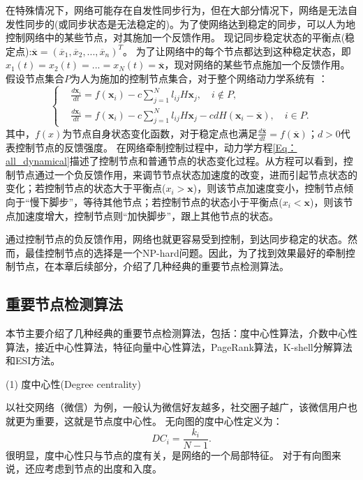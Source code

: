 在特殊情况下，网络可能存在自发性同步行为，但在大部分情况下，网络是无法自发性同步的(或同步状态是无法稳定的)。为了使网络达到稳定的同步，可以人为地控制网络中的某些节点，对其施加一个反馈作用。
现记同步稳定状态的平衡点(稳定点):$\overline{\textbf{x}} = (\overline{x}_1, \overline{x}_2, ..., \overline{x}_n)^T$。
为了让网络中的每个节点都达到这种稳定状态，即$x_1(t) = x_2(t) = ... = x_N(t) = \overline{\textbf{x}} $，现对网络的某些节点施加一个反馈作用。假设节点集合$ P $为人为施加的控制节点集合，对于整个网络动力学系统有 \cite{Zhou2019}：
\begin{equation}
\left\{
\begin{aligned}
&\frac{d\textbf{x}_i}{dt} = f(\textbf{x}_i)-c\sum_{j = 1}^{N}l_{ij}H\textbf{x}_j,\quad  i \notin P, \\
&\frac{d\textbf{x}_{i}}{dt} = f(\textbf{x}_{i})-c\sum_{j = 1}^{N}l_{ij}H \textbf{x}_j-cdH(\textbf{x}_{i}-\overline{\textbf{x}}), \quad i\in P.
\end{aligned}
\right.
\label{Eq：all_dynamical}
\end{equation}
其中，$ f(x) $为节点自身状态变化函数，对于稳定点也满足$\frac{d\overline{\textbf{x}}}{dt}=f(\overline{\textbf{x}})$；$ d>0 $代表控制节点的反馈强度。
在网络牵制控制过程中，动力学方程\ref{Eq：all_dynamical}描述了控制节点和普通节点的状态变化过程。从方程可以看到，控制节点通过一个负反馈作用，来调节节点状态加速度的改变，进而引起节点状态的变化；若控制节点的状态大于平衡点($ x_i>\textbf{x}$)，则该节点加速度变小，控制节点倾向于“慢下脚步”，等待其他节点；若控制节点的状态小于平衡点($ x_i<\textbf{x} $)，则该节点加速度增大，控制节点则“加快脚步”，跟上其他节点的状态。

通过控制节点的负反馈作用，网络也就更容易受到控制，到达同步稳定的状态。然而，最佳控制节点的选择是一个NP-hard问题。因此，为了找到效果最好的牵制控制节点，在本章后续部分，介绍了几种经典的重要节点检测算法。

\subsection{重要节点检测算法}
本节主要介绍了几种经典的重要节点检测算法，包括：度中心性算法，介数中心性算法，接近中心性算法，特征向量中心性算法，PageRank算法，K-shell分解算法和ESI方法。


(1) 度中心性(Degree centrality) \cite{Brodka2011}

以社交网络（微信）为例，一般认为微信好友越多，社交圈子越广，该微信用户也就更为重要，这就是节点度中心性。
无向图的度中心性定义为：
\begin{equation}
DC_i = \frac{k_i}{N-1}.
\end{equation}
很明显，度中心性只与节点的度有关，是网络的一个局部特征。
对于有向图来说，还应考虑到节点的出度和入度。

